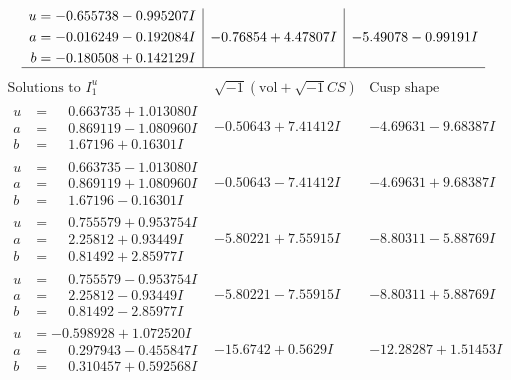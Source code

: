 \documentclass[1p]{elsarticle_modified}
\theoremstyle{definition}
\newcommand{\I}{\sqrt{-1}}
\begin{document}
$$\begin{array}{c|c|c}
\begin{aligned}
u &= -0.655738 - 0.995207 I \\
a &= -0.016249 - 0.192084 I \\
b &= -0.180508 + 0.142129 I\end{aligned}
 & -0.76854 + 4.47807 I & -5.49078 - 0.99191 I\\
 \hline 
 \end{array}$$\newpage$$\begin{array}{c|c|c}  
\text{Solutions to }I^u_{1}& \I (\text{vol} + \sqrt{-1}CS) & \text{Cusp shape}\\
 \hline 
\begin{aligned}
u &= \phantom{-}0.663735 + 1.013080 I \\
a &= \phantom{-}0.869119 - 1.080960 I \\
b &= \phantom{-}1.67196 + 0.16301 I\end{aligned}
 & -0.50643 + 7.41412 I & -4.69631 - 9.68387 I \\ \hline\begin{aligned}
u &= \phantom{-}0.663735 - 1.013080 I \\
a &= \phantom{-}0.869119 + 1.080960 I \\
b &= \phantom{-}1.67196 - 0.16301 I\end{aligned}
 & -0.50643 - 7.41412 I & -4.69631 + 9.68387 I \\ \hline\begin{aligned}
u &= \phantom{-}0.755579 + 0.953754 I \\
a &= \phantom{-}2.25812 + 0.93449 I \\
b &= \phantom{-}0.81492 + 2.85977 I\end{aligned}
 & -5.80221 + 7.55915 I & -8.80311 - 5.88769 I \\ \hline\begin{aligned}
u &= \phantom{-}0.755579 - 0.953754 I \\
a &= \phantom{-}2.25812 - 0.93449 I \\
b &= \phantom{-}0.81492 - 2.85977 I\end{aligned}
 & -5.80221 - 7.55915 I & -8.80311 + 5.88769 I \\ \hline\begin{aligned}
u &= -0.598928 + 1.072520 I \\
a &= \phantom{-}0.297943 - 0.455847 I \\
b &= \phantom{-}0.310457 + 0.592568 I\end{aligned}
 & -15.6742 + 0.5629 I & -12.28287 + 1.51453 I \\ \hline\begin{aligned}

\end{aligned}
\end{array}$$
\end{document}
